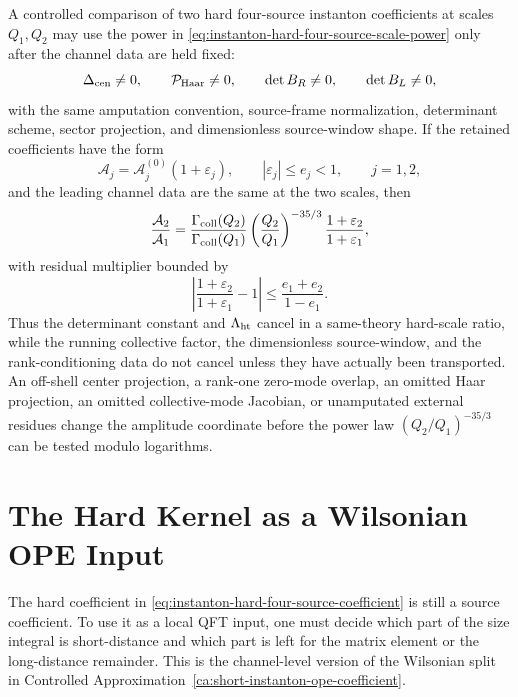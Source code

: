 \begin{controlledapproximation}
\label{ca:instanton-hard-benchmark-gate-ledger}
A controlled comparison of two hard four-source instanton coefficients at
scales \(Q_1,Q_2\) may use the power in
\eqref{eq:instanton-hard-four-source-scale-power} only after the channel data are
held fixed:
\[
  \Delta_{\rm cen}\ne0,\qquad
  \mathcal P_{\rm Haar}\ne0,\qquad
  \det B_R\ne0,\qquad
  \det B_L\ne0,
\]
with the same amputation convention, source-frame normalization, determinant
scheme, sector projection, and dimensionless source-window shape.  If the
retained coefficients have the form
\[
  \mathcal A_j
  =
  \mathcal A_j^{(0)}(1+\varepsilon_j),
  \qquad
  |\varepsilon_j|\le e_j<1,
  \qquad j=1,2,
\]
and the leading channel data are the same at the two scales, then
\begin{equation}
  \frac{\mathcal A_2}{\mathcal A_1}
  =
  \frac{\Gamma_{\rm coll}(Q_2)}{\Gamma_{\rm coll}(Q_1)}
  \left(\frac{Q_2}{Q_1}\right)^{-35/3}
  \frac{1+\varepsilon_2}{1+\varepsilon_1},
  \label{eq:instanton-hard-four-source-ratio}
\end{equation}
with residual multiplier bounded by
\begin{equation}
  \left|
  \frac{1+\varepsilon_2}{1+\varepsilon_1}-1
  \right|
  \le
  \frac{e_1+e_2}{1-e_1}.
  \label{eq:instanton-hard-four-source-ratio-bound}
\end{equation}
Thus the determinant constant and \(\Lambda_{\rm ht}\) cancel in a same-theory
hard-scale ratio, while the running collective factor, the dimensionless
source-window, and the rank-conditioning data do not cancel unless they have
actually been transported.  An off-shell center projection, a rank-one
zero-mode overlap, an omitted Haar projection, an omitted collective-mode
Jacobian, or unamputated external residues change the amplitude coordinate
before the power law \((Q_2/Q_1)^{-35/3}\) can be tested modulo logarithms.
\end{controlledapproximation}

\section{The Hard Kernel as a Wilsonian OPE Input}
\label{sec:instanton-hard-wilsonian-ope-datum}

The hard coefficient in
\eqref{eq:instanton-hard-four-source-coefficient} is still a source
coefficient.  To use it as a local QFT input, one must decide which part of
the size integral is short-distance and which part is left for the matrix
element or the long-distance remainder.  This is the channel-level version of
the Wilsonian split in
Controlled Approximation~\ref{ca:short-instanton-ope-coefficient}.

